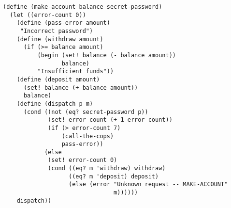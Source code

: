 \documentclass[a4paper,12pt]{article}
\begin{document}
\begin{lstlisting}
(define (make-account balance secret-password)
  (let ((error-count 0))
    (define (pass-error amount)
     "Incorrect password")
    (define (withdraw amount)
      (if (>= balance amount)
          (begin (set! balance (- balance amount))
                 balance)
          "Insufficient funds"))
    (define (deposit amount)
      (set! balance (+ balance amount))
      balance)
    (define (dispatch p m)
      (cond ((not (eq? secret-password p))
             (set! error-count (+ 1 error-count))
             (if (> error-count 7)
                 (call-the-cops)
                 pass-error))
            (else
             (set! error-count 0) 
             (cond ((eq? m 'withdraw) withdraw)
                   ((eq? m 'deposit) deposit)
                   (else (error "Unknown request -- MAKE-ACCOUNT"
                                m))))))
    dispatch))
\end{lstlisting}
\end{document}

